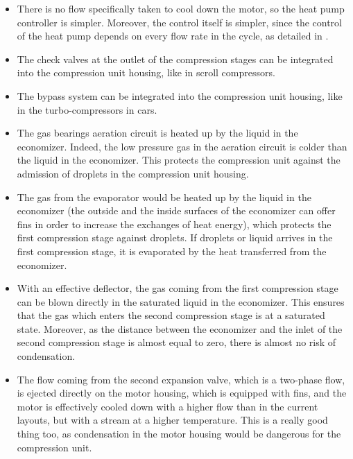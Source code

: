 \begin{itemize}
\item There is no flow specifically taken to cool down the motor, so
  the heat pump controller is simpler. Moreover, the control itself is
  simpler, since the control of the heat pump depends on every flow
  rate in the cycle, as detailed in .
\item The check valves at the outlet of the compression stages can be
  integrated into the compression unit housing, like in scroll
  compressors.
\item The bypass system can be integrated into the compression unit
  housing, like in the turbo-compressors in cars.
\item The gas bearings aeration circuit is heated up by the liquid in
  the economizer. Indeed, the low pressure gas in the aeration circuit
  is colder than the liquid in the economizer. This protects the
  compression unit against the admission of droplets in the
  compression unit housing.
\item The gas from the evaporator would be heated up by the liquid in
  the economizer (the outside and the inside surfaces of the
  economizer can offer fins in order to increase the exchanges of heat
  energy), which protects the first compression stage against
  droplets. If droplets or liquid arrives in the first compression
  stage, it is evaporated by the heat transferred from the economizer.
\item With an effective deflector, the gas coming from the first
  compression stage can be blown directly in the saturated liquid in
  the economizer. This ensures that the gas which enters the second
  compression stage is at a saturated state. Moreover, as the distance
  between the economizer and the inlet of the second compression stage
  is almost equal to zero, there is almost no risk of condensation.
\item The flow coming from the second expansion valve, which is a
  two-phase flow, is ejected directly on the motor housing, which is
  equipped with fins, and the motor is effectively cooled down with a
  higher flow than in the current layouts, but with a stream at a
  higher temperature. This is a really good thing too, as condensation
  in the motor housing would be dangerous for the compression unit.
\end{itemize}

